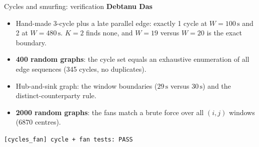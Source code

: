 \documentclass[aspectratio=169,11pt]{beamer}
\newcommand{\memberbadge}[1]{%
  \hfill{\small\bfseries\color{memberred}#1}%
}
\begin{document}
\begin{frame}{Cycles and smurfing: verification \memberbadge{Debtanu Das}}
\begin{itemize}
\setlength{\itemsep}{0.55em}
\item Hand-made 3-cycle plus a late parallel edge: exactly 1 cycle at $W = 100\,\text{s}$ and 2 at $W = 480\,\text{s}$. $K = 2$ finds none, and $W = 19$ versus $W = 20$ is the exact boundary.
\item \textbf{400 random graphs}: the cycle set equals an exhaustive enumeration of all edge sequences (345 cycles, no duplicates).
\item Hub-and-sink graph: the window boundaries ($29\,\text{s}$ versus $30\,\text{s}$) and the distinct-counterparty rule.
\item \textbf{2000 random graphs}: the fans match a brute force over all $(i, j)$ windows (6870 centres).
\end{itemize}

\vspace{0.35cm}
\centering
\colorbox{softbg}{\texttt{[cycles\_fan] cycle + fan tests: PASS}}
\end{frame}
\end{document}
